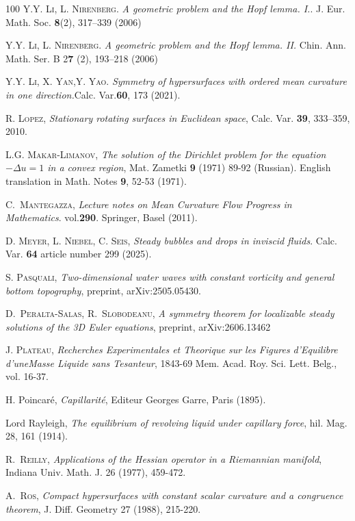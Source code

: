 \documentclass[10pt,reqno,a4paper]{article}
\numberwithin{equation}{section}
\theoremstyle{plain}
\theoremstyle{definition}
\begin{document}
\begin{thebibliography}{100}
\textsc{Y.Y. Li, L. Nirenberg.}\textit{ A geometric problem and the Hopf lemma. I.}. J. Eur. Math. Soc.  {\bf 8}(2), 317–339 (2006)

\textsc{Y.Y. Li, L. Nirenberg.}\textit{ A geometric problem and the Hopf lemma. II.}
 Chin. Ann. Math. Ser. B 2{\bf 7} (2), 193–218 (2006)

 \textsc{Y.Y. Li, X. Yan,Y. Yao.} \textit{ Symmetry of hypersurfaces with ordered mean curvature in one direction.}Calc. Var.{\bf 60}, 173 (2021).

\textsc{R. Lopez}, \textit{Stationary rotating surfaces in Euclidean space}, Calc. Var. {\bf 39}, 333–359, 2010.

 \textsc{L.G. Makar-Limanov}, \textit{ The solution of the Dirichlet problem for the equation $-\Delta u=1$ in a convex region}, Mat.
Zametki {\bf 9} (1971) 89-92 (Russian). English translation in Math. Notes {\bf 9}, 52-53 (1971).

 \textsc{C.\ Mantegazza}, \textit{Lecture notes on Mean Curvature Flow Progress in Mathematics}. vol.{\bf 290}. Springer, Basel (2011).

 \textsc{D. Meyer, L. Niebel, C. Seis}, \textit{ Steady bubbles and drops in inviscid fluids}. Calc. Var. {\bf 64} article number 299 (2025).

 \textsc{S. Pasquali}, \emph{Two-dimensional water waves with constant vorticity and general bottom topography}, preprint, arXiv:2505.05430.

 \textsc{D.\ Peralta-Salas, R.\ Slobodeanu}, \emph{A symmetry theorem for localizable steady solutions of the 3D Euler equations}, preprint, arXiv:2606.13462

 \textsc{J. Plateau}, \emph{Recherches Experimentales et Theorique sur les Figures d'Equilibre d'uneMasse Liquide sans Tesanteur}, 1843-69 Mem. Acad. Roy. Sci. Lett. Belg., vol. 16-37.

 {\sc H. Poincaré}, \emph{Capillarité}, Editeur Georges Garre, Paris (1895).

 {\sc Lord Rayleigh}, \emph{The equilibrium of revolving liquid under capillary force}, hil. Mag. 28, 161 (1914).

 \textsc{R.\ Reilly}, \emph{Applications of the Hessian operator in a Riemannian manifold}, Indiana Univ. Math. J. 26 (1977), 459-472.

 \textsc{A.\ Ros}, \emph{Compact hypersurfaces with constant scalar curvature and a congruence theorem}, J. Diff. Geometry 27 (1988), 215-220. 


\end{thebibliography}
\end{document}
